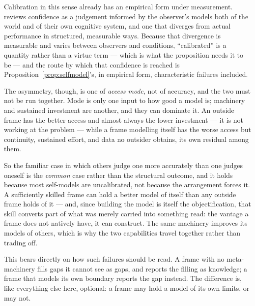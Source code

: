 \documentclass[11pt,a4paper]{article}
\theoremstyle{remark}\newtheorem{remark}[definition]{Remark}
\begin{document}
Calibration in this sense already has an empirical form under measurement.
\citet{fleming2024} reviews confidence as a judgement informed by the observer's
models both of the world and of their own cognitive system, and one that diverges from
actual performance in structured, measurable ways. Because that divergence is
measurable and varies between observers and conditions, ``calibrated'' is a quantity
rather than a virtue term --- which is what the proposition needs it to be --- and the
route by which that confidence is reached is Proposition~\ref{prop:selfmodel}'s, in
empirical form, characteristic failures included.

The asymmetry, though, is one of \emph{access mode}, not of accuracy, and the two must not be run together. Mode is only one input to how good a model is; machinery and sustained investment are another, and they can dominate it. An outside frame has the better access and almost always the lower investment --- it is not working at the problem --- while a frame modelling itself has the worse access but continuity, sustained effort, and data no outsider obtains, its own residual among them.

So the familiar case in which others judge one more accurately than one judges oneself is the \emph{common} case rather than the structural outcome, and it holds because most self-models are uncalibrated, not because the arrangement forces it. A sufficiently skilled frame can hold a better model of itself than any outside frame holds of it --- and, since building the model is itself the objectification, that skill converts part of what was merely carried into something read: the vantage a frame does not natively have, it can construct. The same machinery improves its models of others, which is why the two capabilities travel together rather than trading off.

This bears directly on how such failures should be read. A frame with no meta-machinery fills gaps it cannot see as gaps, and reports the filling as knowledge; a frame that models its own boundary reports the gap instead. The difference is, like everything else here, optional: a frame may hold a model of its own limits, or may not.
\end{document}
